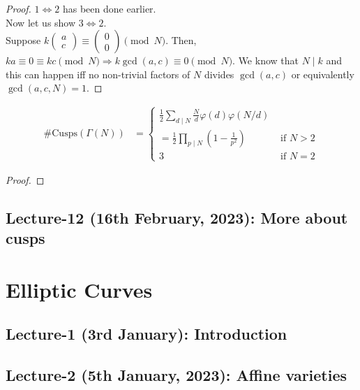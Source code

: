 \documentclass[oneside, 12pt]{scrbook}
\theoremstyle{theorem}
\begin{document}
\begin{proof}
$1 \Leftrightarrow 2$ has been done earlier. \\
Now let us show $3 \Leftrightarrow 2$.\\
Suppose $k\begin{pmatrix}
a \\ c
\end{pmatrix}  \equiv \begin{pmatrix}
0 \\ 0
\end{pmatrix} \pmod{N}$. Then, $ka \equiv 0 \equiv kc \pmod{N} \Rightarrow k\gcd(a,c)\equiv 0 \pmod{N}$. We know that $N\mid k$ and this can happen iff no non-trivial factors of $N$ divides $\gcd(a,c)$ or equivalently $\gcd(a,c,N)=1$. 
\end{proof}

\begin{proposition}
\begin{eqnarray*}
\#\mathrm{Cusps}(\Gamma(N)) &= \begin{cases} \frac{1}{2} \sum_{d \mid N} \frac{N}{d} \varphi(d)\varphi(N/d) \\
= \frac{1}{2} \prod_{p \mid N} \left( 1 - \frac{1}{p^2} \right) & \text{ if } N>2 \\ 3 & \text{ if } N=2  \end{cases}
\end{eqnarray*}
\end{proposition}

\begin{proof}

\end{proof}

\chapter{Lecture-12 (16th February, 2023): More about cusps}






\part{Elliptic Curves}

\chapter{Lecture-1 (3rd January): Introduction }

\chapter{Lecture-2 (5th January, 2023): Affine varieties }
\end{document}
